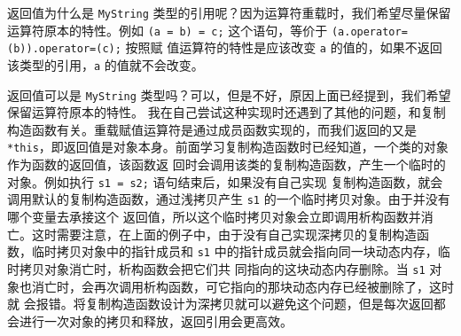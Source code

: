 \documentclass[UTF8]{ctexart}
\begin{document}
返回值为什么是 \texttt{MyString} 类型的引用呢？因为运算符重载时，我们希望尽量保留运算符原本的特性。例如
\texttt{(a = b) = c;} 这个语句，等价于 \texttt{(a.operator=(b)).operator=(c);} 按照赋
值运算符的特性是应该改变 \texttt{a} 的值的，如果不返回该类型的引用，\texttt{a} 的值就不会改变。

返回值可以是 \texttt{MyString} 类型吗？可以，但是不好，原因上面已经提到，我们希望保留运算符原本的特性。
我在自己尝试这种实现时还遇到了其他的问题，和复制构造函数有关。重载赋值运算符是通过成员函数实现的，而我们返回的又是
\texttt{*this}，即返回值是对象本身。前面学习复制构造函数时已经知道，一个类的对象作为函数的返回值，该函数返
回时会调用该类的复制构造函数，产生一个临时的对象。例如执行 \texttt{s1 = s2;} 语句结束后，如果没有自己实现
复制构造函数，就会调用默认的复制构造函数，通过浅拷贝产生 \texttt{s1} 的一个临时拷贝对象。由于并没有哪个变量去承接这个
返回值，所以这个临时拷贝对象会立即调用析构函数并消亡。这时需要注意，在上面的例子中，由于没有自己实现深拷贝的复制构造函
数，临时拷贝对象中的指针成员和 \texttt{s1} 中的指针成员就会指向同一块动态内存，临时拷贝对象消亡时，析构函数会把它们共
同指向的这块动态内存删除。当 \texttt{s1} 对象也消亡时，会再次调用析构函数，可它指向的那块动态内存已经被删除了，这时就
会报错。将复制构造函数设计为深拷贝就可以避免这个问题，但是每次返回都会进行一次对象的拷贝和释放，返回引用会更高效。
\end{document}
